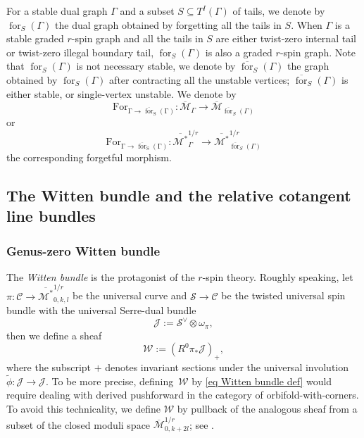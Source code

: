 \documentclass[11pt]{amsart}
\theoremstyle{definition}
\theoremstyle{remark}
\newcommand{\<}{\left<}
\renewcommand{\>}{\right>}
\numberwithin{equation}{section}
\def\Mbar{{\overline{\mathcal M}}}
\def\Mbarstar{{\overline{\mathcal M^*}}}
\begin{document}
 For a stable dual graph $\Gamma$ and a subset $S\subseteq T^I(\Gamma)$ of tails, we denote by $\operatorname{for}_S(\Gamma)$ the dual graph obtained by forgetting all the tails in $S$. When $\Gamma$ is a stable graded $r$-spin graph and all the tails in $S$ are either twist-zero internal tail or twist-zero illegal boundary tail, $\operatorname{for}_S(\Gamma)$ is also a graded $r$-spin graph. Note that $\operatorname{for}_S(\Gamma)$ is not %
necessary stable, we %
denote by $\overline{\operatorname{for}}_S(\Gamma)$ the graph obtained by $\operatorname{for}_S(\Gamma)$ after contracting all the unstable vertices; $\overline{\operatorname{for}}_S(\Gamma)$ is either stable, or single-vertex unstable. We denote by 
 $$
 \operatorname{For_{\Gamma \to \overline{\operatorname{for}}_S(\Gamma)}}\colon \Mbar_{\Gamma}\to \Mbar_{\overline{\operatorname{for}}_S(\Gamma)}
 $$
 or 
 $$
 \operatorname{For_{\Gamma \to \overline{\operatorname{for}}_S(\Gamma)}}\colon \Mbarstar^{1/r}_{\Gamma}\to \Mbarstar^{1/r}_{\overline{\operatorname{for}}_S(\Gamma)}
 $$
 the corresponding forgetful morphism.



\subsection{The Witten bundle and the relative cotangent line bundles}
\label{subsec Witten bundle}
\subsubsection{Genus-zero Witten bundle}
The \textit{Witten bundle} is the protagonist of the $r$-spin theory. Roughly speaking, let $\pi: \mathcal{C} \to \Mbarstar_{0,k,l}^{1/r}$ be the universal curve and $\mathcal{S} \to \mathcal{C}$ be the twisted universal spin bundle with the universal Serre-dual %
bundle 
\begin{equation}\label{eq universal serre dual bundle}
\mathcal{J}:= \mathcal{S}^{\vee} \otimes \omega_{\pi},
\end{equation}
then we %
define a sheaf
\begin{equation}
\label{eq Witten bundle def}
{\mathcal{W}}:= (R^0\pi_*\mathcal{J})_+,
\end{equation}
where the subscript $+$ denotes invariant sections under the universal involution $\widetilde{\phi}: \mathcal{J} \to \mathcal{J}.$ 
To be more precise, defining~${\mathcal{W}}$ by \eqref{eq Witten bundle def} would require dealing with derived pushforward in the category of orbifold-with-corners. To avoid this technicality, we define ${\mathcal{W}}$ by pullback of the analogous sheaf from a subset of the closed moduli space $\Mbar_{0,k+2l}^{1/r}$; see \cite[\S 4.1]{BCT1}. 
\end{document}
